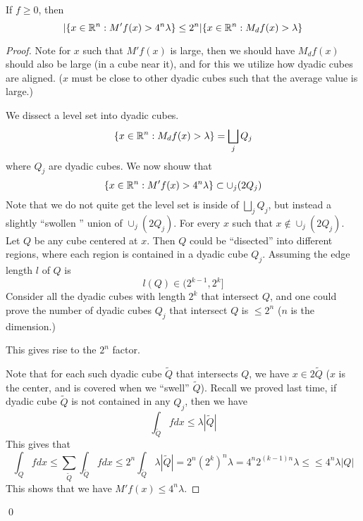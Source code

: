 \begin{lemma}
    If $f\geq 0$, then 
    \begin{equation*}
        |\{x\in\mathbb{R}^n: M'f(x)>4^n\lambda\}\leq 2^n|\{x\in \mathbb{R}^n: M_df(x)>\lambda\}
    \end{equation*}
\end{lemma}
\begin{proof}
    Note for $x$ such that $M'f(x)$ is large, then we should have $M_df(x)$ should also be large (in  a cube near it), and for this we utilize how dyadic cubes are aligned. ($x$ must be close to other dyadic cubes such that the average value is large.)

    We dissect a level set into dyadic cubes. 
    \begin{equation*}
        \{x\in\mathbb{R}^n: M_df(x)>\lambda\}=\bigsqcup_j Q_j
    \end{equation*}
    where $Q_j$ are dyadic cubes. We now shouw that 
    \begin{equation*}
        \{x\in\mathbb{R}^n: M'f(x)>4^n\lambda\}\subset \cup_j(2Q_j)
    \end{equation*} 
    Note that we do not quite get the level set is inside of $\bigsqcup_jQ_j$, but  instead a slightly ``swollen '' union of $\cup_j(2Q_j)$. For every $x$ such that $x\not\in \cup_j(2Q_j)$. Let $Q$ be any  cube centered at $x$. Then $Q$ could be ``disected'' into different regions, where each region is contained in a dyadic cube $Q_j$. Assuming the edge length $l$ of $Q$ is
    \begin{equation*}
        l(Q)\in (2^{k-1}, 2^k]
    \end{equation*}
    Consider all the dyadic cubes with length $2^k$ that intersect $Q$, and one could prove the number of dyadic cubes $Q_j$ that intersect $Q$ is $\leq 2^n$ ($n$ is the dimension.)
    \begin{note}
        This gives rise to the $2^n$ factor.
    \end{note}
    Note that for each such dyadic cube $\tilde{Q}$ that intersects $Q$, we have $x\in 2\tilde{Q}$ ($x$ is the center, and is covered when we ``swell'' $\tilde{Q}$). Recall we proved last time, if dyadic cube $\tilde{Q}$ is not contained in any $Q_j$, then we have
    \begin{equation*}
        \int_{\tilde{Q}}fdx\leq\lambda|\tilde{Q}|
    \end{equation*}
    This gives that
    \begin{equation*}
        \int_Qfdx\leq\sum_{\tilde{Q}}\int_{\tilde{Q}}fdx\leq 2^n\int_{\tilde{Q}}\lambda|\tilde{Q}|=2^n(2^k)^n\lambda=4^n 2^{(k-1)n}\lambda\leq\leq 4^n\lambda|Q|
    \end{equation*}
    This shows that we have $M'f(x)\leq 4^n\lambda$.
\end{proof}
\qed

